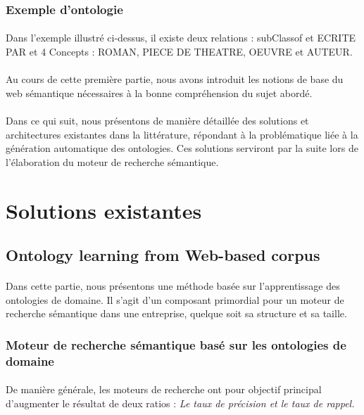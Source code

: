 \documentclass[12pt, a4paper, oneside]{book}
\begin{document}
\subsubsection{Exemple d'ontologie}
\paragraph{}
Dans l'exemple illustré ci-dessus, il existe deux relations : subClassof et ECRITE PAR et 4 Concepts : ROMAN, PIECE DE THEATRE, OEUVRE et AUTEUR.

\paragraph{}
Au cours de cette première partie, nous avons introduit les notions de base du web sémantique nécessaires à la bonne compréhension du sujet abordé.
\paragraph{}
Dans ce qui suit, nous présentons de manière détaillée des solutions et architectures existantes dans la littérature, répondant à la problématique liée à la génération automatique des ontologies.
Ces solutions serviront par la suite lors de l'élaboration du moteur de recherche sémantique.

\newpage
\section{Solutions existantes}

\subsection{Ontology learning from Web-based corpus}

\paragraph{}
Dans cette partie, nous présentons une méthode basée sur l'apprentissage des ontologies de domaine\citep{inproceedings}. Il s'agit d'un composant primordial pour un moteur de recherche sémantique dans une entreprise, quelque soit sa structure et sa taille.
\subsubsection{Moteur de recherche sémantique basé sur les ontologies de domaine}
\paragraph{}
De manière générale, les moteurs de recherche ont pour objectif principal d'augmenter le résultat de deux ratios : \emph{Le taux de précision et le taux de rappel.} \citep{defOnto}
\end{document}
